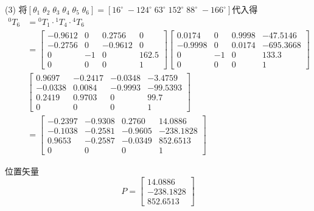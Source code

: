 \documentclass[UTF8, 12pt]{ctexart}
\begin{document}
(3)
将\([\theta_1 \; \theta_2 \; \theta_3 \; \theta_4 \; \theta_5 \; \theta_6] = [16^\circ \; -124^\circ \; 63^\circ \; 152^\circ \; 88^\circ \; -166^\circ]\)代入得
\[
\begin{aligned}
{}^0T_6 &= {}^0T_1 \cdot {}^1T_4 \cdot {}^4T_6 \\
        &= \begin{bmatrix}
            -0.9612 & 0 & 0.2756 & 0 \\
            -0.2756 & 0 & -0.9612 & 0 \\
            0 & -1 & 0 & 162.5 \\
            0 & 0 & 0 & 1
            \end{bmatrix}
            \begin{bmatrix}
            0.0174 & 0 & 0.9998 & -47.5146 \\
            -0.9998 & 0 & 0.0174 & -695.3668 \\
            0 & -1 & 0 & 133.3 \\
            0 & 0 & 0 & 1
            \end{bmatrix} \\
            &\begin{bmatrix}
            0.9697 & -0.2417 & -0.0348 & -3.4759 \\
            -0.0338 & 0.0084 & -0.9993 & -99.5393 \\
            0.2419 & 0.9703 & 0 & 99.7 \\
            0 & 0 & 0 & 1
            \end{bmatrix} \\
        &= \begin{bmatrix}
            -0.2397 & -0.9308 & 0.2760 & 14.0886 \\
            -0.1038 & -0.2581 & -0.9605 & -238.1828 \\
            0.9653 & -0.2587 & -0.0349 & 852.6513 \\
            0 & 0 & 0 & 1
            \end{bmatrix}
\end{aligned}
\]
\vspace{0.5em}

位置矢量
\[
P = \begin{bmatrix}
    14.0886 \\ -238.1828 \\ 852.6513 
    \end{bmatrix}
\]
\end{document}
